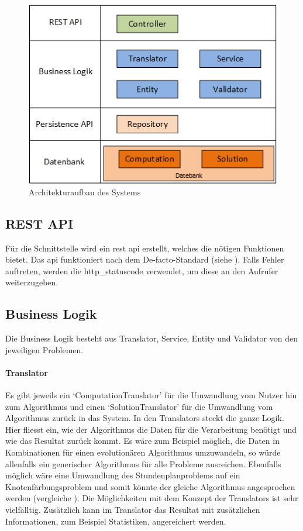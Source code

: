 \begin{figure}[h]
\centering
\includegraphics[scale=0.8]{images/visio/architektur_db.png}
\caption[Architekturaufbau des Systems]{Architekturaufbau des Systems \selfmade{}}
\label{fig:architektur}
\end{figure}
 
\FloatBarrier
\subsection{REST API}
Für die Schnittstelle wird ein \gls{rest} \gls{api} erstellt, welches die nötigen Funktionen bietet. Das \gls{api} funktioniert nach dem De-facto-Standard 
(siehe \cite{wiki_restful}). Falls Fehler auftreten, werden die \gls{http_statuscode} verwendet, um diese an den Aufrufer weiterzugeben.

\subsection{Business Logik}
Die Business Logik besteht aus Translator, Service, Entity und Validator von den jeweiligen Problemen. 
\paragraph{Translator}
Es gibt jeweils ein `ComputationTranslator' für die Umwandlung vom Nutzer hin zum Algorithmus und einen `SolutionTranslator' für die Umwandlung vom Algorithmus zurück in das System. In den 
Translators steckt die ganze Logik. Hier fliesst ein, wie der Algorithmus die Daten für die Verarbeitung benötigt und wie das Resultat zurück kommt. Es wäre zum Beispiel möglich, die Daten in 
Kombinationen für einen evolutionären Algorithmus umzuwandeln, so würde allenfalls ein generischer Algorithmus für alle Probleme ausreichen. Ebenfalls möglich wäre eine Umwandlung des 
Stundenplanproblems auf ein Knotenfärbungsproblem und somit könnte der gleiche Algorithmus angesprochen werden (vergleiche \cite{timetabling_abdullah}). Die Möglichkeiten mit dem 
Konzept der Translators ist sehr vielfälltig. Zusätzlich kann im Translator das Resultat mit zusätzlichen Informationen, zum Beispiel Statistiken, angereichert werden.
